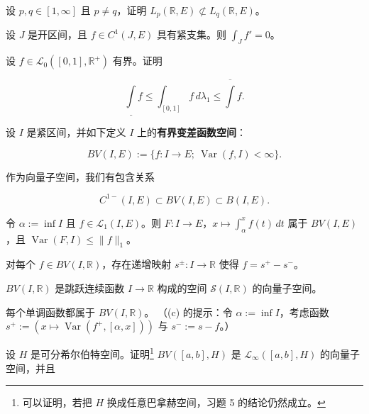 \begin{exercises}
\item

设 $ p, q \in [1,\infty] $ 且 $ p \ne q $，证明 $ L_p(\mathbb{R},E) \not\subset L_q(\mathbb{R},E) $。

\item

设 $ J $ 是开区间，且 $ f \in C^1(J,E) $ 具有紧支集。则 $ \int_J f' = 0 $。

\item

设 $ f \in \mathcal{L}_0([0,1],\mathbb{R}^+) $ 有界。证明

\[
\underline{\int} f \le \int_{[0,1]} f \, d\lambda_1 \le \overline{\int} f .
\]
\item

设 $ I $ 是紧区间，并如下定义 $ I $ 上的\textbf{有界变差函数空间}：

\[
BV(I,E) := \{ f: I \to E ;\ \operatorname{Var}(f,I) < \infty \} .
\]

\begin{items}
\item

作为向量子空间，我们有包含关系

\[
C^{1-}(I,E) \subset BV(I,E) \subset B(I,E) .
\]
\item

令 $ \alpha := \inf I $ 且 $ f \in \mathcal{L}_1(I,E) $。则 $ F: I \to E $，$ x \mapsto \int_\alpha^x f(t) \, dt $ 属于 $ BV(I,E) $，且 $ \operatorname{Var}(F,I) \le \|f\|_1 $。

\item

对每个 $ f \in BV(I,\mathbb{R}) $，存在递增映射 $ s^\pm: I \to \mathbb{R} $ 使得 $ f = s^+ - s^- $。

\item

$ BV(I,\mathbb{R}) $ 是跳跃连续函数 $ I \to \mathbb{R} $ 构成的空间 $ \mathcal{S}(I,\mathbb{R}) $ 的向量子空间。

\item

每个单调函数都属于 $ BV(I,\mathbb{R}) $。
（(c) 的提示：令 $ \alpha := \inf I $，考虑函数 $ s^+ := (x \mapsto \operatorname{Var}(f^+,[\alpha,x])) $ 与 $ s^- := s - f $。）

\end{items}

\item

设 $ H $ 是可分希尔伯特空间。证明\footnote{可以证明，若把 $ H $ 换成任意巴拿赫空间，习题 5 的结论仍然成立。} $ BV([a,b],H) $ 是 $ \mathcal{L}_\infty([a,b],H) $ 的向量子空间，并且


\end{exercises}

